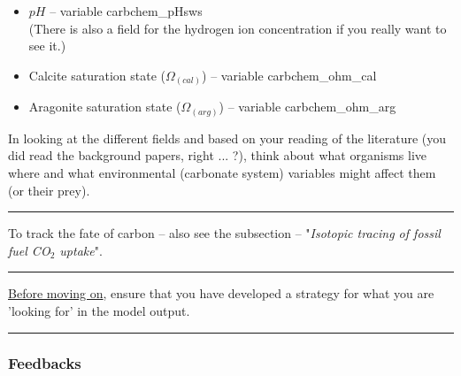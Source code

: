 \vspace{1mm}
\begin{itemize}[noitemsep]
\item \(pH\) -- variable \textsf{\footnotesize carbchem\_pHsws} 
\\(There is also a field for the hydrogen ion concentration if you really want to see it.)
\item Calcite saturation state (\(\Omega_{(cal)}\)) -- variable \textsf{\footnotesize carbchem\_ohm\_cal}
\item Aragonite saturation state (\(\Omega_{(arg)}\)) -- variable \textsf{\footnotesize carbchem\_ohm\_arg} 
\end{itemize}

\vspace{1mm}
\noindent In looking at the different fields and based on your reading of the literature (you did read the background papers, right ... ?), think about what organisms live where and what environmental (carbonate system) variables might affect them (or their prey).

\vspace{1mm} \noindent\rule{4cm}{0.1mm} \vspace{2mm}

\noindent To track the fate of carbon -- also see the subsection -- "\textit{Isotopic tracing of fossil fuel CO$_{2}$ uptake}".

\vspace{1mm} \noindent\rule{4cm}{0.1mm} \vspace{2mm}

\vspace{1mm}
\noindent \uline{Before moving on}, ensure that you have developed a strategy for what you are 'looking for' in the model output.

\vspace{1mm} \noindent\rule{4cm}{0.1mm} \vspace{2mm}

\vspace{-1mm}
\subsubsection*{Feedbacks}

